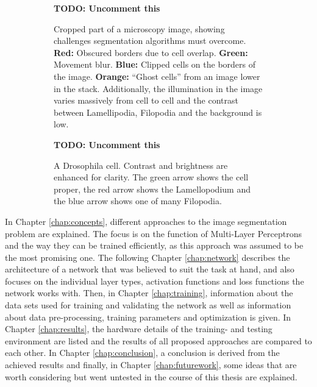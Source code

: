 \begin {figure}[!ht]	
	\centering
	\begin {subfigure}[t]{0.52\linewidth}
		\textbf{TODO: Uncomment this}

		\caption*{Cropped part of a microscopy image, showing challenges segmentation algorithms must overcome. \textbf{Red:} Obscured borders due to cell overlap. \textbf{Green:} Movement blur. \textbf{Blue:} Clipped cells on the borders of the image. \textbf{Orange:} ``Ghost cells'' from an image lower in the stack. Additionally, the illumination in the image varies massively from cell to cell and the contrast between Lamellipodia, Filopodia and the background is low.}
	\end {subfigure}
	\hspace{1cm}
	\begin {subfigure}[t]{0.35\linewidth}
		\textbf{TODO: Uncomment this}

		\caption*{A Drosophila cell. Contrast and brightness are enhanced for clarity. The green arrow shows the cell proper, the red arrow shows the Lamellopodium and the blue arrow shows one of many Filopodia.}
	\end {subfigure}

	\caption[]{}
	\label{fig:cell_example}
\end {figure}

\noindent In Chapter \ref{chap:concepts}, different approaches to the image segmentation problem are explained. The focus is on the function of Multi-Layer Perceptrons and the way they can be trained efficiently, as this approach was assumed to be the most promising one. The following Chapter \ref{chap:network} describes the architecture of a network that was believed to suit the task at hand, and also focuses on the individual layer types, activation functions and loss functions the network works with. Then, in Chapter \ref{chap:training}, information about the data sets used for training and validating the network as well as information about data pre-processing, training parameters and optimization is given. In Chapter \ref{chap:results}, the hardware details of the training- and testing environment are listed and the results of all proposed approaches are compared to each other. In Chapter \ref{chap:conclusion}, a conclusion is derived from the achieved results and finally, in Chapter \ref{chap:futurework}, some ideas that are worth considering but went untested in the course of this thesis are explained. 